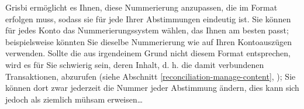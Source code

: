 Grisbi ermöglicht es Ihnen, diese Nummerierung anzupassen, die im Format  erfolgen muss, sodass sie für jede Ihrer Abstimmungen eindeutig ist. Sie können für jedes Konto das Nummerierungssystem wählen, das Ihnen am besten passt; beispielsweise könnten Sie dieselbe Nummerierung wie auf Ihren Kontoauszügen verwenden. Sollte die  aus irgendeinem Grund nicht diesem Format entsprechen, wird es für Sie schwierig sein, deren Inhalt, d. h. die damit verbundenen Transaktionen, abzurufen (siehe Abschnitt \vref{reconciliation-manage-content}, ); Sie können dort zwar jederzeit die Nummer jeder Abstimmung ändern, dies kann sich jedoch als ziemlich mühsam erweisen\ldots

